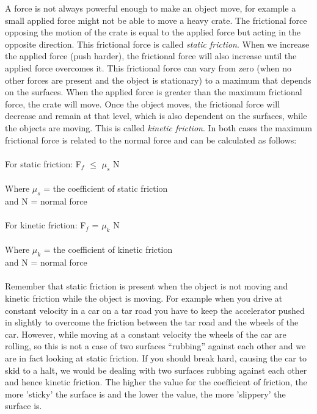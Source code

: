 A force is not always powerful enough to make an object move, for example a small applied force might not be able to move a heavy crate. The frictional force opposing the motion of the crate is equal to the applied force but acting in the opposite direction. This frictional force is called \emph{static friction}. When we increase the applied force (push harder), the frictional force will also increase until the applied force overcomes it. This frictional force can vary from zero (when no other forces are present and the object is stationary) to a maximum that depends on the surfaces. When the applied force is greater than the maximum frictional force, the crate will move. Once the object moves, the frictional force will decrease and remain at that level, which is also dependent on the surfaces, while the objects are moving. This is called \emph{kinetic friction}. In both cases the maximum frictional force is related to the normal force and can be calculated as follows:\\
\\
For static friction: F$_f$ $\leq$ $\mu_s$ N\\
\\
Where $\mu_s$ = the coefficient of static friction\\
and N = normal force\\
\\
For kinetic friction: F$_f$ = $\mu_k$ N\\
\\
Where $\mu_k$ = the coefficient of kinetic friction\\
and N = normal force\\
\\
Remember that static friction is present when the object is not moving and kinetic friction while the object is moving. For example when you drive at constant velocity in a car on a tar road you have to keep the accelerator pushed in slightly to overcome the friction between the tar road and the wheels of the car. However, while moving at a constant velocity the wheels of the car are rolling, so this is not a case of two surfaces ``rubbing'' against each other and we are in fact looking at static friction. If you should break hard, causing the car to skid to a halt, we would be dealing with two surfaces rubbing against each other and hence kinetic friction. The higher the value for the coefficient of friction, the more 'sticky' the surface is and the lower the value, the more 'slippery' the surface is.\\

